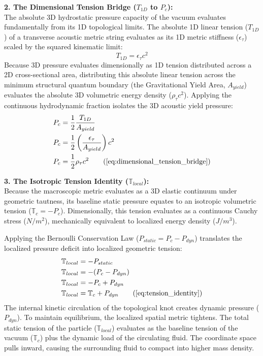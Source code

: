 \documentclass[11pt, a4paper]{article}
\begin{document}
\textbf{2. The Dimensional Tension Bridge ($T_{1D}$ to $P_c$):} \\
The absolute 3D hydrostatic pressure capacity of the vacuum evaluates fundamentally from its 1D topological limits. The absolute 1D linear tension ($T_{1D}$) of a transverse acoustic metric string evaluates as its 1D metric stiffness ($\epsilon_{\tau}$) scaled by the squared kinematic limit:
\begin{equation}
    T_{1D} = \epsilon_{\tau} c^2 \label{eq:1d_tension}
\end{equation}
Because 3D pressure evaluates dimensionally as 1D tension distributed across a 2D cross-sectional area, distributing this absolute linear tension across the minimum structural quantum boundary (the Gravitational Yield Area, $A_{yield}$) evaluates the absolute 3D volumetric energy density ($\rho_{\tau} c^2$). Applying the continuous hydrodynamic fraction isolates the 3D acoustic yield pressure:
\begin{align}
    P_c &= \frac{1}{2} \frac{T_{1D}}{A_{yield}} \nonumber \\
    P_c &= \frac{1}{2} \left( \frac{\epsilon_{\tau}}{A_{yield}} \right) c^2 \nonumber \\
    P_c &= \frac{1}{2} \rho_{\tau} c^2 \tag{\ref{eq:dimensional_tension_bridge}}
\end{align}

\textbf{3. The Isotropic Tension Identity ($\mathbb{T}_{local}$):} \\
Because the macroscopic metric evaluates as a 3D elastic continuum under geometric tautness, its baseline static pressure equates to an isotropic volumetric tension ($\mathbb{T}_c = -P_c$). Dimensionally, this tension evaluates as a continuous Cauchy stress ($N/m^2$), mechanically equivalent to localized energy density ($J/m^3$). 

Applying the Bernoulli Conservation Law ($P_{static} = P_c - P_{dyn}$) translates the localized pressure deficit into localized geometric tension:
\begin{align}
    \mathbb{T}_{local} &= - P_{static} \nonumber \\
    \mathbb{T}_{local} &= - (P_c - P_{dyn}) \nonumber \\
    \mathbb{T}_{local} &= -P_c + P_{dyn} \nonumber \\
    \mathbb{T}_{local} &= \mathbb{T}_c + P_{dyn} \tag{\ref{eq:tension_identity}}
\end{align}
The internal kinetic circulation of the topological knot creates dynamic pressure ($P_{dyn}$). To maintain equilibrium, the localized spatial metric tightens. The total static tension of the particle ($\mathbb{T}_{local}$) evaluates as the baseline tension of the vacuum ($\mathbb{T}_c$) plus the dynamic load of the circulating fluid. The coordinate space pulls inward, causing the surrounding fluid to compact into higher mass density.
\end{document}

